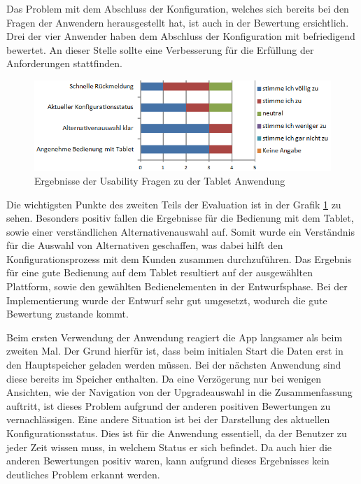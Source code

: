Das Problem mit dem Abschluss der Konfiguration, welches sich bereits bei den Fragen der Anwendern herausgestellt hat, ist auch in der Bewertung ersichtlich. Drei der vier Anwender haben dem Abschluss der Konfiguration mit befriedigend bewertet. An dieser Stelle sollte eine Verbesserung für die Erfüllung der Anforderungen stattfinden. \par 
\begin{figure}[H]
\centering
\includegraphics{images/bewertung_ux}
\caption{Ergebnisse der Usability Fragen zu der Tablet Anwendung}
\label{bewertungUx}
\end{figure}
Die wichtigsten Punkte des zweiten Teils der Evaluation ist in der Grafik \ref{bewertungUx} zu sehen. Besonders positiv fallen die Ergebnisse für die Bedienung mit dem Tablet, sowie einer verständlichen Alternativenauswahl auf. Somit wurde ein Verständnis für die Auswahl von Alternativen geschaffen, was dabei hilft den Konfigurationsprozess mit dem Kunden zusammen durchzuführen. Das Ergebnis für eine gute Bedienung auf dem Tablet resultiert auf der ausgewählten Plattform, sowie den gewählten Bedienelementen in der Entwurfsphase. Bei der Implementierung wurde der Entwurf sehr gut umgesetzt, wodurch die gute Bewertung zustande kommt. \par 

Beim ersten Verwendung der Anwendung reagiert die App langsamer als beim zweiten Mal. Der Grund hierfür ist, dass beim initialen Start die Daten erst in den Hauptspeicher geladen werden müssen. Bei der nächsten Anwendung sind diese bereits im Speicher enthalten. Da eine Verzögerung nur bei wenigen Ansichten, wie der Navigation von der Upgradeauswahl in die Zusammenfassung auftritt, ist dieses Problem aufgrund der anderen positiven Bewertungen zu vernachlässigen. Eine andere Situation ist bei der Darstellung des aktuellen Konfigurationsstatus. Dies ist für die Anwendung essentiell, da der Benutzer zu jeder Zeit wissen muss, in welchem Status er sich befindet. Da auch hier die anderen Bewertungen positiv waren, kann aufgrund dieses Ergebnisses kein deutliches Problem erkannt werden.

